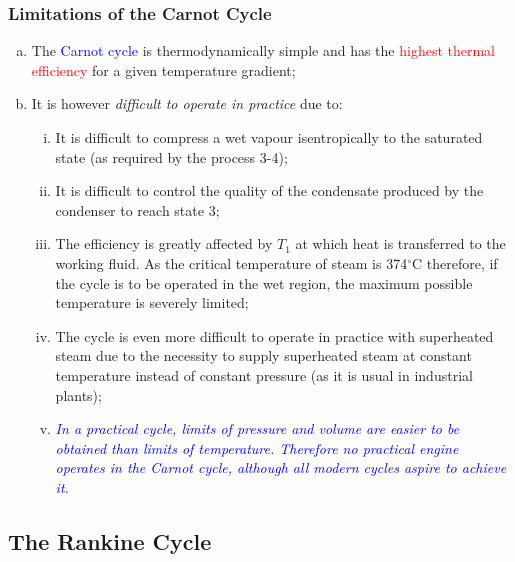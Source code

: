 \documentclass[10pt,compress]{beamer}
\newcommand{\red}{\textcolor{red}}
\newcommand{\blue}{\textcolor{blue}}
\begin{document}
\begin{frame}
 \frametitle{Limitations of the Carnot Cycle}
 \begin{enumerate}[(a)]
  \item <1-> The \blue{Carnot cycle} is thermodynamically simple and has the \red{highest thermal efficiency} for a given temperature gradient;
  \item <2-> It is however {\it difficult to operate in practice} due to:
  \begin{enumerate}[(i)] %
   \item <3-> It is difficult to compress a wet vapour isentropically to the saturated state (as required by the process 3-4);
   \item <4-> It is difficult to control the quality of the condensate produced by the condenser to reach state 3;
   \item <5-> The efficiency is greatly affected by $T_{1}$ at which heat is transferred to the working fluid. As the critical temperature of steam is 374$^{\circ}$C therefore, if the cycle is to be operated in the wet region, the maximum possible temperature is severely limited;
   \item <6-> The cycle is even more difficult to operate in practice with superheated steam due to the necessity to supply superheated steam at constant temperature instead of constant pressure (as it is usual in industrial plants);
   \item <7-> \textcolor{blue}{{\it In a practical cycle, limits of pressure and volume are easier to be obtained than limits of temperature. Therefore no practical engine operates in the Carnot cycle, although all modern cycles aspire to achieve it.}}
  \end{enumerate}
 \end{enumerate}
 \normalsize
\end{frame}

\subsection{The Rankine Cycle}
\end{document}

